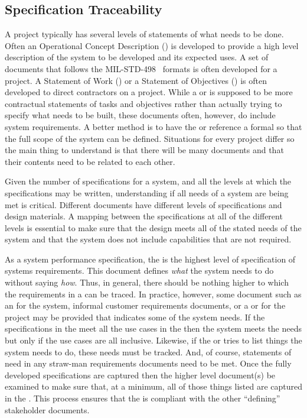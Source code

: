 
\subsection{Specification Traceability}
\label{ssec:Intro_SpecTrace}%

A project typically has several levels of statements of what needs to be done.
Often an Operational Concept Description (\OCD) is developed to provide a high level description of the system to be developed and its expected uses.
A set of documents that follows the MIL-STD-498~\cite{ref__MIL_STD_498} \DID formats is often developed for a project.
A Statement of Work (\SOW) or a Statement of Objectives (\SOO) is often developed to direct contractors on a project.
While a \SOW or \SOO is supposed to be more contractual statements of tasks and objectives rather than actually trying to specify what needs to be built, these documents often, however, do include system requirements.
A better method is to have the \SOW or \SOO reference a formal \SPS so that the full scope of the system can be defined.
Situations for every project differ so the main thing to understand is that there will be many documents and that their contents need to be related to each other.


Given the number of specifications for a system, and all the levels at which the specifications may be written, understanding if all needs of a system are being met is critical.
Different documents have different levels of specifications and design materials.
A mapping between the specifications at all of the different levels is essential to make sure that the design meets all of the stated needs of the system and that the system does not include capabilities that are not required.


As a system performance specification, the \SPS is the highest level of specification of systems requirements.
This document defines {\em what} the system needs to do without saying {\em how}.
Thus, in general, there should be nothing higher to which the requirements in a \SPS can be traced.
In practice, however, some document such as an \OCD for the system, informal customer requirements documents, or a \SOW or \SOO for the project may be provided that indicates some of the system needs.
If the specifications in the \SPS meet all the use cases in the \OCD then the system meets the needs but only if the use cases are all inclusive.
Likewise, if the \SOW or \SOO tries to list things the system needs to do, these needs must be tracked.
And, of course, statements of need in any straw-man requirements documents need to be met.
Once the fully developed \SPS specifications are captured then the higher level document(s) be examined to make sure that, at a minimum, all of those things listed are captured in the \SPS.
This process ensures that the \SPS is compliant with the other ``defining'' stakeholder documents.


